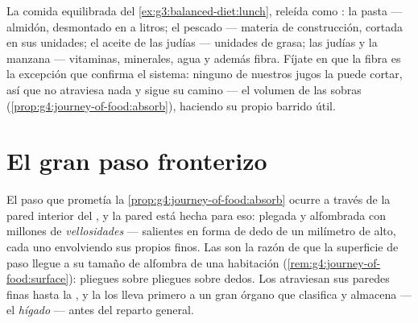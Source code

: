 \begin{example}\label{ex:g7:digestion-and-nutrients:lunch}
La comida equilibrada del \cref{ex:g3:balanced-diet:lunch}, releída
como : la pasta --- almidón, desmontado en  a litros;
el pescado --- materia de construcción, cortada en sus unidades; el
aceite de las judías --- unidades de grasa; las judías y la manzana ---
vitaminas, minerales, agua y además fibra. Fíjate en que la fibra es la
excepción que confirma el sistema: ninguno de nuestros jugos la puede
cortar, así que no atraviesa nada y sigue su camino --- el volumen de
las sobras (\cref{prop:g4:journey-of-food:absorb}), haciendo su propio
barrido útil.
\end{example}

\section{El gran paso fronterizo}

\begin{proposition}\label{prop:g7:digestion-and-nutrients:absorption}
El paso que prometía la \cref{prop:g4:journey-of-food:absorb} ocurre a
través de la pared interior del , y la pared está
hecha para eso: plegada y alfombrada con millones de
\emph{vellosidades} --- salientes en forma de dedo de
un milímetro de alto, cada uno envolviendo sus propios  finos. Las  son la razón de que la superficie de
paso llegue a su tamaño de alfombra de una habitación
(\cref{rem:g4:journey-of-food:surface}): pliegues sobre pliegues sobre
dedos. Los  atraviesan sus paredes finas hasta la , y
la  los lleva primero a un gran órgano que clasifica y almacena
--- el \emph{hígado} --- antes del reparto general.
\end{proposition}
\admitted

